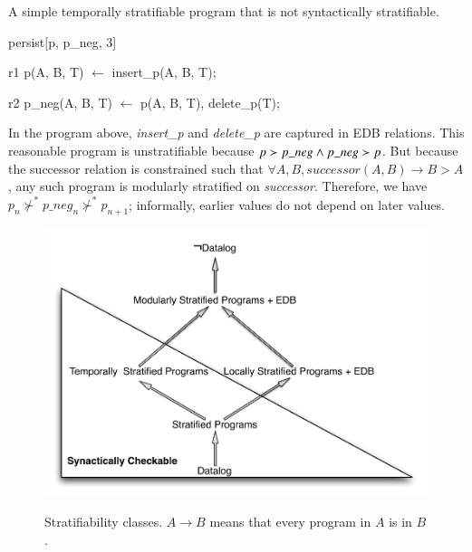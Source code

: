 \begin{example}
A simple temporally stratifiable \slang program that is not syntactically stratifiable.

\begin{Dedalus}
persist[p, p\_neg, 3]  
  
r1
p(A, B, T) \(\leftarrow\)
  insert\_p(A, B, T);

r2  
p_neg(A, B, T) \(\leftarrow\)
  p(A, B, T),
  delete\_p(T);
\end{Dedalus}

In the \slang program above, \emph{insert\_p} and \emph{delete\_p} are captured
in EDB relations.  This reasonable program is unstratifiable because $p \succ
p\nega \land p\nega \succ p$.  But because the successor relation is
constrained such that $\forall A,B, successor(A, B) \rightarrow B > A$, any
such program is modularly stratified on \emph{successor}.  Therefore, we have
$p_{n} \not\succ^* p\_neg_{n} \not\succ^* p_{n+1}$; informally, earlier values
do not depend on later values.
\end{example}

\begin{figure}[t]
  \centering
  \includegraphics[width=0.75\linewidth]{figures/dedalus_classes.pdf}
  \label{fig:dedalus-classes}
  \caption{Stratifiability classes.  $A \to B$ means that every program in $A$ is in $B$.}
\vspace{-8pt}
\end{figure}



